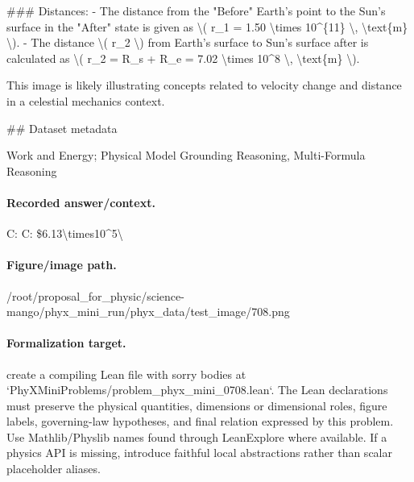 \#\#\# Distances:
- The distance from the "Before" Earth's point to the Sun's surface in the "After" state is given as \textbackslash{}( r\_1 = 1.50 \textbackslash{}times 10\textasciicircum{}\{11\} \textbackslash{}, \textbackslash{}text\{m\} \textbackslash{}).
- The distance \textbackslash{}( r\_2 \textbackslash{}) from Earth's surface to Sun's surface after is calculated as \textbackslash{}( r\_2 = R\_s + R\_e = 7.02 \textbackslash{}times 10\textasciicircum{}8 \textbackslash{}, \textbackslash{}text\{m\} \textbackslash{}).

This image is likely illustrating concepts related to velocity change and distance in a celestial mechanics context.

\#\# Dataset metadata

Work and Energy; Physical Model Grounding Reasoning, Multi-Formula Reasoning

\paragraph{Recorded answer/context.}
C: C: \$6.13\textbackslash{}times10\textasciicircum{}5\textbackslash{}

\paragraph{Figure/image path.}
/root/proposal\_for\_physic/science-mango/phyx\_mini\_run/phyx\_data/test\_image/708.png

\paragraph{Formalization target.}
create a compiling Lean file with sorry bodies at `PhyXMiniProblems/problem\_phyx\_mini\_0708.lean`. The Lean declarations must preserve the physical quantities, dimensions or dimensional roles, figure labels, governing-law hypotheses, and final relation expressed by this problem.
Use Mathlib/Physlib names found through LeanExplore where available. If a physics API is missing, introduce faithful local abstractions rather than scalar placeholder aliases.

